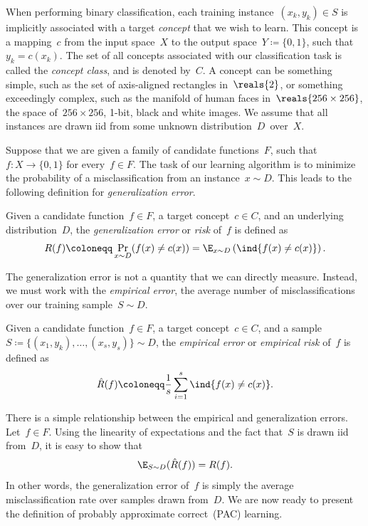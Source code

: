 \documentclass[11pt,a4paper]{article}
\numberwithin{equation}{section}
\begin{document}
When performing binary classification, each training instance~$(x_k, y_k) \in S$
is implicitly associated with a target \emph{concept} that we wish to learn.
This concept is a mapping~$c$ from the input space~$X$ to the output space~$Y
\coloneqq \{0, 1\}$, such that~$y_k = c(x_k)$. The set of all concepts
associated with our classification task is called the \emph{concept class}, and
is denoted by~$C$. A concept can be something simple, such as the set of
axis-aligned rectangles in~$\reals{2}$, or something exceedingly complex, such
as the manifold of human faces in~$\reals{256 \times 256}$, the space of~$256
\times 256$, 1-bit, black and white images. We assume that all instances are
drawn iid from some unknown distribution~$D$~over~$X$.

Suppose that we are given a family of candidate functions~$F$, such that~$f : X
\to \{0, 1\}$ for every~$f \in F$. The task of our learning algorithm is to
minimize the probability of a misclassification from an instance~$x \sim D$.
This leads to the following definition for \emph{generalization error}.

\begin{definition}
Given a candidate function~$f \in F$, a target concept~$c \in C$, and an
underlying distribution~$D$, the \emph{generalization error} or \emph{risk}
of~$f$ is defined as
\[
	R(f) \coloneqq \Pr_{x \sim D}(f(x) \neq c(x)) =
		\E_{x \sim D} \left(\ind{f(x) \neq c(x)}\right).
\]
\end{definition}

The generalization error is not a quantity that we can directly measure.
Instead, we must work with the \emph{empirical error}, the average number of
misclassifications over our training sample~$S \sim D$.

\begin{definition}
Given a candidate function~$f \in F$, a target concept~$c \in C$, and a
sample~$S \coloneqq \{(x_1, y_k), \ldots, (x_s, y_s)\} \sim D$, the
\emph{empirical error} or \emph{empirical risk} of~$f$ is defined as
\[
	\hat{R}(f) \coloneqq \frac{1}{s} \sum_{i = 1}^s \ind{f(x) \neq c(x)}.
\]
\end{definition}

There is a simple relationship between the empirical and generalization errors.
Let~$f \in F$. Using the linearity of expectations and the fact that~$S$ is
drawn iid from~$D$, it is easy to show that
\[
	\E_{S \sim D} (\hat{R}(f)) = R(f).
\]
In other words, the generalization error of~$f$ is simply the average
misclassification rate over samples drawn from~$D$. We are now ready to present
the definition of probably approximate correct~(PAC) learning.
\end{document}
